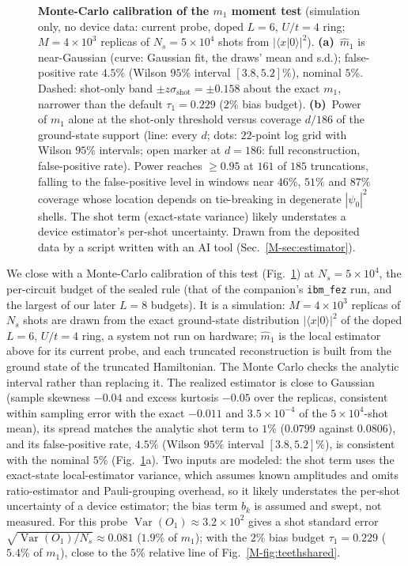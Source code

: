 \documentclass[aps,prb,onecolumn,superscriptaddress,longbibliography,floatfix]{revtex4-2}
\begin{document}
\begin{figure}[t]
\centering
{}
\caption{\textbf{Monte-Carlo calibration of the $m_1$ moment test} (simulation only, no device data: current probe, doped $L=6$, $U/t=4$ ring; $M=4\times10^3$ replicas of ${N_s=5\times10^4}$ shots from $|\langle x|0\rangle|^2$). \textbf{(a)}~$\widehat m_1$ is near-Gaussian (curve: Gaussian fit, the draws' mean and s.d.); false-positive rate $4.5\%$ (Wilson $95\%$ interval $[3.8,5.2]\%$), nominal $5\%$. Dashed: shot-only band $\pm z\sigma_{\mathrm{shot}}=\pm0.158$ about the exact $m_1$, narrower than the default ${\tau_1=0.229}$ ($2\%$ bias budget). \textbf{(b)}~Power of $m_1$ alone at the shot-only threshold versus coverage $d/186$ of the ground-state support (line: every $d$; dots: $22$-point log grid with Wilson $95\%$ intervals; open marker at $d=186$: full reconstruction, false-positive rate). Power reaches $\ge0.95$ at $161$ of $185$ truncations, falling to the false-positive level in windows near $46\%$, $51\%$ and $87\%$ coverage whose location depends on tie-breaking in degenerate $|\psi_0|^2$ shells. The shot term (exact-state variance) likely understates a device estimator's per-shot uncertainty. Drawn from the deposited data by a script written with an AI tool (Sec.~\ref{M-sec:estimator}).}
\label{fig:momentmc}
\end{figure}
We close with a Monte-Carlo calibration of this test (Fig.~\ref{fig:momentmc}) at $N_s=5\times10^4$, the per-circuit budget of the sealed rule (that of the companion's \texttt{ibm\_fez} run, and the largest of our later $L=8$ budgets). It is a simulation: $M=4\times10^3$ replicas of $N_s$ shots are drawn from the exact ground-state distribution $|\langle x|0\rangle|^2$ of the doped $L=6$, $U/t=4$ ring, a system not run on hardware; $\widehat m_1$ is the local estimator above for its current probe, and each truncated reconstruction is built from the ground state of the truncated Hamiltonian. The Monte Carlo checks the analytic interval rather than replacing it. The realized estimator is close to Gaussian (sample skewness $-0.04$ and excess kurtosis $-0.05$ over the replicas, consistent within sampling error with the exact $-0.011$ and $3.5\times10^{-4}$ of the $5\times10^4$-shot mean), its spread matches the analytic shot term to $1\%$ ($0.0799$ against $0.0806$), and its false-positive rate, $4.5\%$ (Wilson $95\%$ interval $[3.8,5.2]\%$), is consistent with the nominal $5\%$ (Fig.~\ref{fig:momentmc}a). Two inputs are modeled: the shot term uses the exact-state local-estimator variance, which assumes known amplitudes and omits ratio-estimator and Pauli-grouping overhead, so it likely understates the per-shot uncertainty of a device estimator; the bias term $b_k$ is assumed and swept, not measured. For this probe $\operatorname{Var}(O_1)\approx3.2\times10^{2}$ gives a shot standard error $\sqrt{\operatorname{Var}(O_1)/N_s}\approx0.081$ ($1.9\%$ of $m_1$); with the $2\%$ bias budget $\tau_1=0.229$ ($5.4\%$ of $m_1$), close to the $5\%$ relative line of Fig.~\ref{M-fig:teethshared}.
\end{document}
